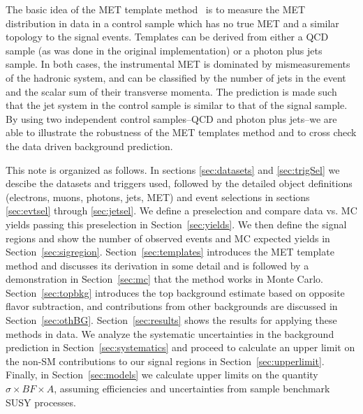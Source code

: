 The basic idea of the MET template method~\cite{ref:templates1}\cite{ref:templates2} is 
to measure the MET distribution in data in a control sample which has no true MET 
and a similar topology to the signal events. 
Templates can be derived from either a QCD sample (as was done in the original implementation) 
or a photon plus jets sample.
In both cases, the instrumental MET is dominated by mismeasurements of the hadronic system,
and can be classified by the number of jets in the event and the scalar sum of their transverse
momenta.
The prediction is made such that the jet system in the control sample is similar to that of the
signal sample.
By using two independent control samples--QCD and photon plus jets--we are able to illustrate
the robustness of the MET templates method and to cross check the data driven background 
prediction.

This note is organized as follows. 
In sections \ref{sec:datasets} and \ref{sec:trigSel} we descibe
the datasets and triggers used, followed by the detailed object definitions (electrons, muons, photons,
jets, MET) and event selections in sections \ref{sec:evtsel} through \ref{sec:jetsel}.
We define a preselection and compare data vs. MC yields passing this preselection in 
Section~\ref{sec:yields}.
We then define the signal regions and show the number of observed events and MC expected 
yields in Section~\ref{sec:sigregion}.
Section~\ref{sec:templates} introduces the MET template method and discusses its derivation 
in some detail and is followed by a demonstration in Section~\ref{sec:mc} 
that the method works in Monte Carlo.
Section~\ref{sec:topbkg} introduces the top background estimate based on opposite flavor subtraction, 
and contributions from other backgrounds are discussed in Section~\ref{sec:othBG}.
Section~\ref{sec:results} shows the results for applying these methods in data.
We analyze the systematic uncertainties in the background prediction in Section~\ref{sec:systematics} 
and proceed to calculate an upper limit on the non-SM contributions to our signal regions 
in Section~\ref{sec:upperlimit}. 
Finally, in Section~\ref{sec:models} we calculate upper limits on the quantity 
$\sigma \times BF \times A$, 
assuming efficiencies and uncertainties from sample benchmark SUSY processes. 

